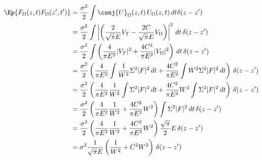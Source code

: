 \begin{equation}
\begin{split}
\Ep{F_\Omega(z,t) F_\Omega(z',t')} &= \frac{\sigma^2}{2} \int \conj{U}_\Omega(z,t)\,U_\Omega(z,t) \,dt \delta(z-z') \\
&= \frac{\sigma^2}{2} \int \left|\left(\frac{2}{\sqrt{\pi}E }V_T  - \frac{2C}{\sqrt{\pi}E }V_\Omega\right)\right|^2 \,dt \, \delta(z-z')\\
&= \frac{\sigma^2}{2} \int \left( \frac{4}{\pi E^2 }|V_T|^2  + \frac{4C^2}{\pi E^2 }|V_\Omega|^2\right) \,dt \, \delta(z-z')\\ &= \frac{\sigma^2}{2} \left( \frac{4}{\pi E^2 } \int \frac{1}{W^2} \Sigma^2 |F|^2 \,dt + \frac{4C^2}{\pi E^2 } \int W^2 \Sigma^2 |F|^2 \,dt\right)   \, \delta(z-z')\\
&= \frac{\sigma^2}{2} \left( \frac{4}{\pi E^2 } \frac{1}{W^2} \int  \Sigma^2 |F|^2 \,dt + \frac{4C^2}{\pi E^2 } W^2 \int \Sigma^2 |F|^2 \,dt\right)  \, \delta(z-z')\\
 &= \frac{\sigma^2}{2} \left( \frac{4}{\pi E^2 } \frac{1}{W^2}   + \frac{4C^2}{\pi E^2 } W^2 \right)  \int \Sigma^2 |F|^2  \,dt \, \delta(z-z')\\
 &= \frac{\sigma^2}{2} \left( \frac{4}{\pi E^2 } \frac{1}{W^2}   + \frac{4C^2}{\pi E^2 } W^2 \right)  \frac{\sqrt{\pi}}{2}E \, \delta(z-z')\\
 &=  \sigma^2 \frac{1}{\sqrt{\pi}E} \left( \frac{1}{W^2}   + C^2W^2 \right)   \, \delta(z-z')\\
\end{split}
\end{equation}

